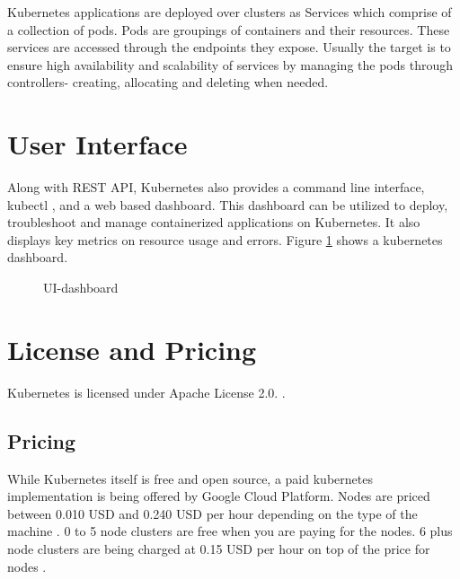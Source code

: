 \documentclass[9pt,twocolumn,twoside]{../../styles/osajnl}
\begin{document}
Kubernetes applications are deployed over clusters as Services which comprise of a collection of pods. Pods are groupings of containers and their resources. These services are accessed through the endpoints they expose. Usually the target is to ensure high availability and scalability of services by managing the pods through controllers- creating, allocating and deleting when needed.


\section{User Interface}
Along with REST API, Kubernetes also provides a command line interface, kubectl \cite{www-kubectl}, and a web based dashboard. 
This dashboard can be utilized to deploy, troubleshoot and manage containerized applications on Kubernetes.
It also displays key metrics on resource usage and errors.
Figure \ref{fig:Kubernetes UI-dashboard} shows a kubernetes dashboard.

\begin{figure}[htbp]
\centering
{}
\caption{UI-dashboard \cite{www-kubernetesuidoc}}
\label{fig:Kubernetes UI-dashboard}
\end{figure}




\section{License and Pricing}
Kubernetes is licensed under Apache License 2.0. \cite{www-kuberneteslic}.

\subsection{Pricing}
While Kubernetes itself is free and open source, a paid kubernetes implementation is being offered by Google Cloud Platform.
Nodes are priced between 0.010 USD and 0.240 USD per hour depending on the type of the machine \cite{www-googlecontengpricing}.
0 to 5 node clusters are free when you are paying for the nodes.
6 plus node clusters are being charged at 0.15  USD per hour on top of the price for nodes \cite{www-googlecloudpricing}.
\end{document}
